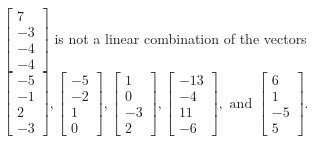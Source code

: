 \begin{exercise}
\begin{exerciseStatement}
  \end{exerciseStatement}
  \begin{exerciseAnswer}
   \(\left[\begin{array}{c}
7 \\
-3 \\
-4 \\
-4
\end{array}\right]\) 
  	 is not  
	a linear combination of the vectors \(\left[\begin{array}{c}
-5 \\
-1 \\
2 \\
-3
\end{array}\right] , \left[\begin{array}{c}
-5 \\
-2 \\
1 \\
0
\end{array}\right] , \left[\begin{array}{c}
1 \\
0 \\
-3 \\
2
\end{array}\right] , \left[\begin{array}{c}
-13 \\
-4 \\
11 \\
-6
\end{array}\right] , \text{ and } \left[\begin{array}{c}
6 \\
1 \\
-5 \\
5
\end{array}\right]\).

	
  


  \end{exerciseAnswer}
\end{exercise}
